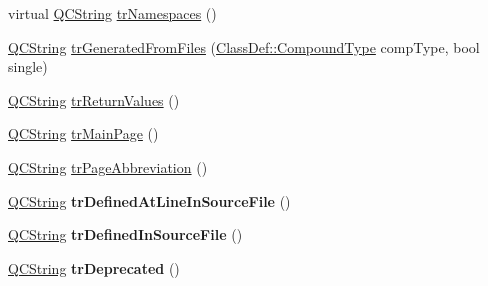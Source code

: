 \begin{DoxyCompactItemize}
\item 
virtual \hyperlink{class_q_c_string}{Q\-C\-String} \hyperlink{class_translator_slovene_ab509be45cc3774f62f622ccca0ea7e20}{tr\-Namespaces} ()
\item 
\hyperlink{class_q_c_string}{Q\-C\-String} \hyperlink{class_translator_slovene_a2c9f8ab8b1a6ef2b514ceaf4f2fbfcdb}{tr\-Generated\-From\-Files} (\hyperlink{class_class_def_a768a6f0a6fd7e9087ff7971abbcc3f36}{Class\-Def\-::\-Compound\-Type} comp\-Type, bool single)
\item 
\hyperlink{class_q_c_string}{Q\-C\-String} \hyperlink{class_translator_slovene_a6e464db5f9409cf3e05373c732034db5}{tr\-Return\-Values} ()
\item 
\hyperlink{class_q_c_string}{Q\-C\-String} \hyperlink{class_translator_slovene_a55afa9d76071992e385357f6cffb37ae}{tr\-Main\-Page} ()
\item 
\hyperlink{class_q_c_string}{Q\-C\-String} \hyperlink{class_translator_slovene_a4248866912d235cac5f7336db70fff9a}{tr\-Page\-Abbreviation} ()
\item 
\hypertarget{class_translator_slovene_adc253b88ffe7628a37260627a8c0b29a}{\hyperlink{class_q_c_string}{Q\-C\-String} {\bfseries tr\-Defined\-At\-Line\-In\-Source\-File} ()}\label{class_translator_slovene_adc253b88ffe7628a37260627a8c0b29a}

\item 
\hypertarget{class_translator_slovene_aa11e744c82b96bf72abdf5edeed3ea55}{\hyperlink{class_q_c_string}{Q\-C\-String} {\bfseries tr\-Defined\-In\-Source\-File} ()}\label{class_translator_slovene_aa11e744c82b96bf72abdf5edeed3ea55}

\item 
\hypertarget{class_translator_slovene_ae6520e844a4d922882ef91f7598c792f}{\hyperlink{class_q_c_string}{Q\-C\-String} {\bfseries tr\-Deprecated} ()}\label{class_translator_slovene_ae6520e844a4d922882ef91f7598c792f}


\end{DoxyCompactItemize}
